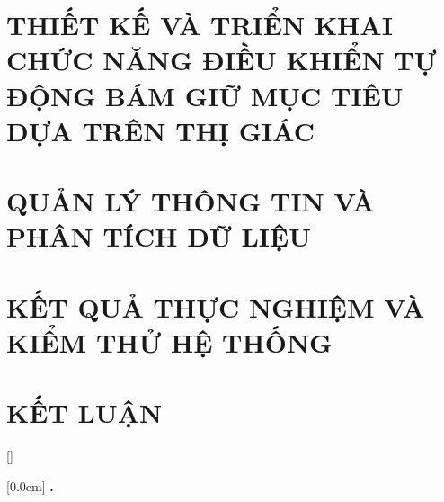 \documentclass[a4paper,13pt,3p,twoside]{report}
\theoremstyle{definition}
\begin{document}
\newpage
\chapter{THIẾT KẾ VÀ TRIỂN KHAI CHỨC NĂNG ĐIỀU KHIỂN TỰ ĐỘNG BÁM GIỮ MỤC TIÊU DỰA TRÊN THỊ GIÁC}
\label{chapter:auto_control}


\newpage
\chapter{QUẢN LÝ THÔNG TIN VÀ PHÂN TÍCH DỮ LIỆU}
\label{chapter:web_platform}


\newpage
\chapter{KẾT QUẢ THỰC NGHIỆM VÀ KIỂM THỬ HỆ THỐNG}
\label{chapter:results}


\newpage
\chapter{KẾT LUẬN}
\label{chapter:conclusion}






{}[]
\titlespacing*{\chapter}{0pt}{-20pt}{20pt}

    [0.0cm]             %
    {\bfseries\vspace{0.3cm}}                  %
    {{\bfseries{\scshape} \thecontentslabel.\ }} %
    {}         %
    {\contentspage}         %
\end{document}
